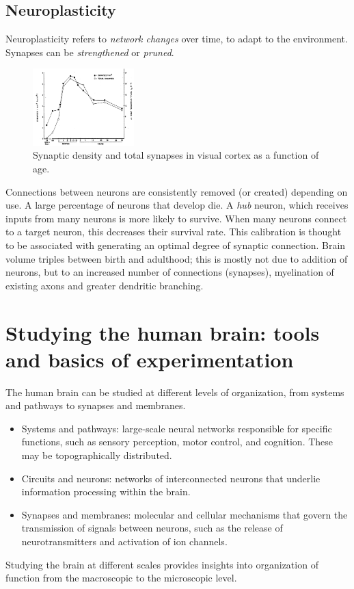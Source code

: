 \subsection{Neuroplasticity}
Neuroplasticity refers to \textit{network changes} over time, to adapt to the environment.
Synapses can be \textit{strengthened} or \textit{pruned}.

\begin{figure}
  \centering
  \includegraphics[width=0.35\textwidth]{images/neuroplasticity.png}
  \caption*{Synaptic density and total synapses in visual cortex as a function of age.}
\end{figure}
Connections between neurons are consistently removed (or created) depending on use.
A large percentage of neurons that develop die. A \textit{hub} neuron, which receives inputs from many neurons is more likely to survive. When many neurons connect to a target neuron, this decreases their survival rate. This calibration is thought to be associated with generating an optimal degree of 
synaptic connection.
Brain volume triples between birth and adulthood; this is mostly not due to addition of neurons, but to an increased number of connections (synapses), myelination of existing axons and greater dendritic branching.

\section{Studying the human brain: tools and basics of experimentation}
The human brain can be studied at different levels of organization, from systems and pathways to synapses and membranes.
\begin{itemize}
    \item Systems and pathways: large-scale neural networks responsible for specific functions, such as sensory perception, motor control, and cognition. These may be topographically distributed.
    \item Circuits and neurons: networks of interconnected neurons that underlie information processing within the brain.
    \item Synapses and membranes: molecular and cellular mechanisms that govern the transmission of signals between neurons, such as the release of neurotransmitters and activation of ion channels.
\end{itemize}
Studying the brain at different scales provides insights into organization of function from the macroscopic to the microscopic level.

